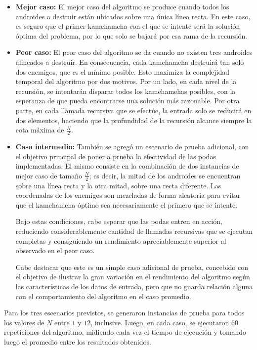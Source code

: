             \begin{itemize}
                \item \textbf{Mejor caso:} El mejor caso del algoritmo se produce cuando todos los androides a destruir están ubicados sobre una única línea recta. En este caso, es seguro que el primer kamehameha con el que se intente será la solución óptima del problema, por lo que solo se bajará por esa rama de la recursión.

                \item \textbf{Peor caso:} El peor caso del algoritmo se da cuando no existen tres androides alineados a destruir. En consecuencia, cada kamehameha destruirá tan solo dos enemigos, que es el mínimo posible. Esto maximiza la complejidad temporal del algoritmo por dos motivos. Por un lado, en cada nivel de la recursión, se intentarán disparar todos los kamehamehas posibles, con la esperanza de que pueda encontrarse una solución más razonable. Por otra parte, en cada llamada recursiva que se efectúe, la entrada solo se reducirá en dos elementos, haciendo que la profundidad de la recursión alcance siempre la cota máxima de $\frac{N}{2}$.

                \item \textbf{Caso intermedio:} También se agregó un escenario de prueba adicional, con el objetivo principal de poner a prueba la efectividad de las podas implementadas. El mismo consiste en la combinación de dos instancias de mejor caso de tamaño $\frac{N}{2}$; es decir, la mitad de los androides se encuentran sobre una línea recta y la otra mitad, sobre una recta diferente. Las coordenadas de los enemigos son mezcladas de forma aleatoria para evitar que el kamehameha óptimo sea necesariamente el primero que se intente.
                
                Bajo estas condiciones, cabe esperar que las podas entren en acción, reduciendo considerablemente cantidad de llamadas recursivas que se ejecutan completas y consiguiendo un rendimiento apreciablemente superior al observado en el peor caso.

                Cabe destacar que este es un simple caso adicional de prueba, concebido con el objetivo de ilustrar la gran variación en el rendimiento del algoritmo según las características de los datos de entrada, pero que no guarda relación alguna con el comportamiento del algoritmo en el caso promedio.
            \end{itemize}

            Para los tres escenarios previstos, se generaron instancias de prueba para todos los valores de $N$ entre $1$ y $12$, inclusive. Luego, en cada caso, se ejecutaron $60$ repeticiones del algoritmo, midiendo cada vez el tiempo de ejecución y tomando luego el promedio entre los resultados obtenidos.


